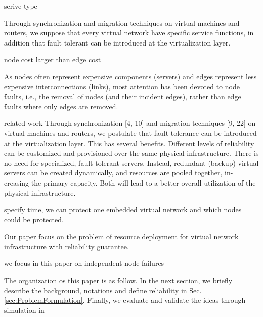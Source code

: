serive type

Through synchronization\cite{bressoud1996hypervisor,cully2008remus} and migration techniques\cite{clark2005live,wang2008virtual} on virtual machines and routers, we suppose that every virtual network have specific service functions, in addition that fault tolerant can be introduced at the virtualization layer\cite{yeow2011designing}.

node cost larger than edge cost

As nodes often represent expensive components (servers) and edges represent less expensive interconnections (links), most attention has been devoted to node faults, i.e., the removal of nodes (and their incident edges), rather than edge faults where only edges are removed.

related work
Through synchronization [4, 10] and migration techniques [9, 22] on virtual machines and routers, we postulate that
fault tolerance can be introduced at the virtualization layer. This has several benefits. Different levels of reliability can
be customized and provisioned over the same physical infrastructure. There is no need for specialized, fault tolerant
servers. Instead, redundant (backup) virtual servers can be created dynamically, and resources are pooled together, in-
creasing the primary capacity. Both will lead to a better overall utilization of the physical infrastructure.


specify time, we can protect one embedded virtual network and which nodes could be protected.

Our paper focus on the problem of resource deployment for virtual network infrastructure with reliability guarantee.

we focus in this paper on independent node failures

The organization os this paper is as follow. In the next section, we briefly describe the background, notations and define reliability in Sec.\ref{sec:ProblemFormulation}. Finally, we evaluate and validate the ideas through simulation in
%

